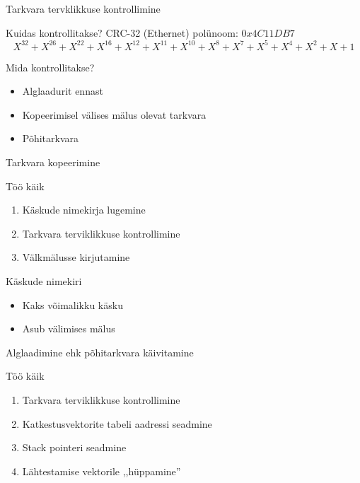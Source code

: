 \documentclass[pdf]{beamer}
\begin{document}
\begin{frame}{Tarkvara tervklikkuse kontrollimine}
    \begin{block}{Kuidas kontrollitakse?}
        CRC-32 (Ethernet) polünoom: \( 0x4C11DB7\)
        \[ X^{32} + X^{26} + X^{22} + X^{16} + X^{12}
            + X^{11} + X^{10} + X^8 + X^7 + X^5 + X^4
        + X^2 + X + 1\]
    \end{block}
    \begin{block}{Mida kontrollitakse?}
        \begin{itemize}
            \item Alglaadurit ennast
            \item Kopeerimisel välises mälus olevat tarkvara
            \item Põhitarkvara
        \end{itemize}
    \end{block}
\end{frame}

\begin{frame}{Tarkvara kopeerimine}
    \begin{block}{Töö käik}
        \begin{enumerate}
            \item Käskude nimekirja lugemine
            \item Tarkvara terviklikkuse kontrollimine
            \item Välkmälusse kirjutamine
        \end{enumerate}
    \end{block}
    \begin{block}{Käskude nimekiri}
        \begin{itemize}
            \item Kaks võimalikku käsku
            \item Asub välimises mälus
        \end{itemize}
    \end{block}
\end{frame}

\begin{frame}{Alglaadimine ehk põhitarkvara käivitamine}
    \begin{block}{Töö käik}
        \begin{enumerate}
            \item Tarkvara terviklikkuse kontrollimine
            \item Katkestusvektorite tabeli aadressi seadmine
            \item Stack pointeri seadmine
            \item Lähtestamise vektorile ,,hüppamine''
        \end{enumerate}
    \end{block}
\end{frame}
\end{document}
